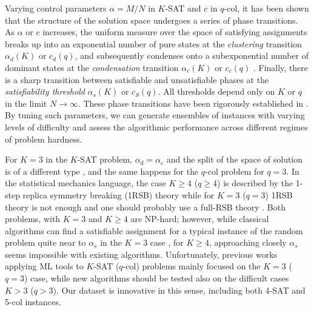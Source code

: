 \documentclass{article}
\begin{document}
Varying control parameters $\alpha = M/N$ in $K$-SAT and $c$ in $q$-col, it has been shown that the structure of the solution space undergoes a series of phase transitions. As $\alpha$ or $c$ increases, the uniform measure over the space of satisfying assignments breaks up into an exponential number of pure states at the \textit{clustering} transition $\alpha_d(K)$ or $c_d(q)$, and subsequently condenses onto a subexponential number of dominant states at the \textit{condensation} transition $\alpha_c(K)$ or $c_c(q)$ \cite{krzakala2007gibbs}.
Finally, there is a sharp transition between satisfiable and unsatisfiable phases at the \textit{satisfiability threshold} $\alpha_s(K)$ or $c_S(q)$. All thresholds depend only on $K$ or $q$ in the limit $N \to \infty$. These phase transitions have been rigorously established in \cite{Ding2022annalen}.
By tuning such parameters, we can generate ensembles of instances with varying levels of difficulty and assess the algorithmic performance across different regimes of problem hardness. 

For $K=3$ in the $K$-SAT problem, $\alpha_d=\alpha_c$ and the split of the space of solution is of a different type \cite{Montanari_2008}, and the same happens for the $q$-col problem for $q=3$. In the statistical mechanics language, the case $K\ge4$ ($q\ge 4$) is described by the 1-step replica symmetry breaking (1RSB) theory while for $K=3$ ($q=3$) 1RSB theory is not enough and one should probably use a full-RSB theory \cite{mezard1987spin, mezard2009information}. Both problems, with $K=3$ and $K\ge 4$ are NP-hard; however, while classical algorithms can find a satisfiable assignment for a typical instance of the random problem quite near to $\alpha_s$ in the $K=3$ case \cite{marino_backtracking_2016}, for $K\ge4$, approaching closely $\alpha_s$ seems impossible with existing algorithms. Unfortunately, previous works applying ML tools to $K$-SAT ($q$-col) problems mainly focused on the $K=3$ ($q=3$) case, while new algorithms should be tested also on the difficult cases $K>3$ ($q>3$). Our dataset is innovative in this sense, including both 4-SAT and 5-col instances. 
\end{document}
